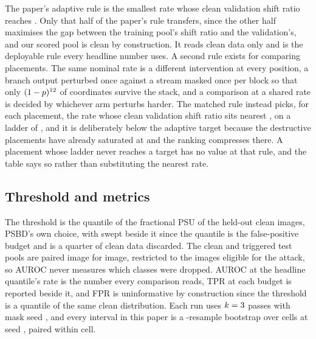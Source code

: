 \documentclass[../main.tex]{subfiles}
\begin{document}
The paper's adaptive rule is the smallest rate whose clean validation shift ratio reaches \AdaptiveShiftTarget{}. Only that half of the paper's rule transfers, since the other half maximises the gap between the training pool's shift ratio and the validation's, and our scored pool is clean by construction. It reads clean data only and is the deployable rule every headline number uses. A second rule exists for comparing placements. The same nominal rate is a different intervention at every position, a branch output perturbed once against a stream masked once per block so that only $(1-p)^{12}$ of coordinates survive the stack, and a comparison at a shared rate is decided by whichever arm perturbs harder. The matched rule instead picks, for each placement, the rate whose clean validation shift ratio sits nearest \PlacementMatchTarget{}, on a ladder of \ShiftMatchTargets{}, and it is deliberately below the adaptive target because the destructive placements have already saturated at \AdaptiveShiftTarget{} and the ranking compresses there. A placement whose ladder never reaches a target has no value at that rule, and the table says so rather than substituting the nearest rate.

\subsection{Threshold and metrics}

The threshold is the \HeadlineQuantile{} quantile of the fractional PSU of the \HeldoutSize{} held-out clean images, PSBD's own choice, with \PsbdQuantiles{} swept beside it since the quantile is the false-positive budget and \HeadlineQuantilePercent{} is a quarter of clean data discarded. The clean and triggered test pools are paired image for image, restricted to the images eligible for the attack, so AUROC never measures which classes were dropped. AUROC at the headline quantile's rate is the number every comparison reads, TPR at each budget is reported beside it, and FPR is uninformative by construction since the threshold is a quantile of the same clean distribution. Each run uses $k = 3$ passes with mask seed \MaskSeed{}, and every interval in this paper is a \BootstrapResamples{}-resample bootstrap over cells at seed \BootstrapSeed{}, paired within cell.
\end{document}

